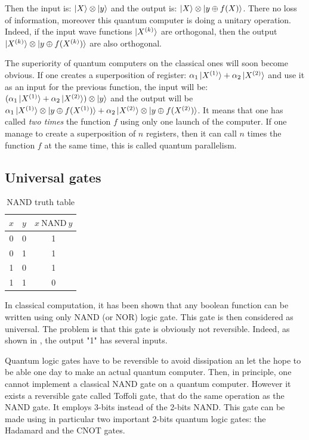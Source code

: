 \documentclass[%
]{scrreprt}
\begin{document}
\par Then the input is: $\ket{X} \otimes \ket{y}$ and the output is: $\ket{X} \otimes \ket{y \oplus f(X)}$. There no loss of information, moreover this quantum computer is doing a unitary operation. Indeed, if the input wave functions $\ket{X^{(k)}}$ are orthogonal, then the output $\ket{X^{(k)}} \otimes \ket{y \oplus f(X^{(k)})}$ are also orthogonal.

\par The superiority of quantum computers on the classical ones will soon become obvious. If one creates a superposition of register: $\alpha_1 \ket{X^{(1)}}  + \alpha_2 \ket{X^{(2)}}$ and use it as an input for the previous function, the input will be: $( \alpha_1 \ket{X^{(1)}}  + \alpha_2 \ket{X^{(2)}} ) \otimes \ket{y}$ and the output will be $\alpha_1 \ket{X^{(1)}} \otimes \ket{y \oplus f(X^{(1)})} + \alpha_2 \ket{X^{(2)}} \otimes \ket{y \oplus f(X^{(2)})}$. It means that one has called \emph{two times} the function $f$ using only one launch of the computer. If one manage to create a superposition of $n$ registers, then it can call $n$ times the function $f$ at the same time, this is called quantum parallelism.

\subsection{Universal gates}

\begin{table}
  \vspace{-10pt}
  \centering
  \begin{tabular}{||c|c||c||}
    \hline
    $x$ & $y$ & $x\ \mathrm{NAND} \ y$\\
    \hline \hline
    0 & 0 & 1\\
    0 & 1 & 1\\
    1 & 0 & 1\\
    1 & 1 & 0\\
    \hline
  \end{tabular}
  \caption{\label{NAND-tab} NAND truth table}
  \vspace{-10pt}
\end{table}

\par In classical computation, it has been shown that any boolean function can be written using only NAND (or NOR) logic gate. This gate is then considered as universal. The problem is that this gate is obviously not reversible. Indeed, as shown in , the output "1" has several inputs.
\par Quantum logic gates  have to be reversible to avoid dissipation an let the hope to be able one day to make an actual quantum computer. Then, in principle, one cannot implement a classical NAND gate on a quantum computer. However it exists a reversible gate called Toffoli gate, that do the same operation as the NAND gate. It employs 3-bits instead of the 2-bits NAND. This gate can be made using in particular two important 2-bits quantum logic gates: the Hadamard and the CNOT gates.
\end{document}
